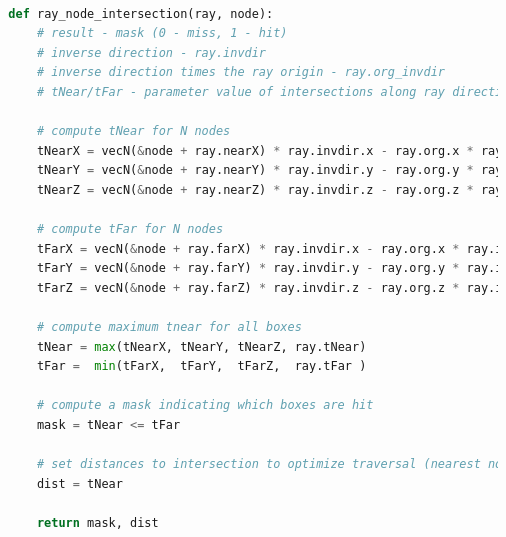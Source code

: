 





\begin{lstlisting}[language=Python,basicstyle=\tiny,caption={A non-branching
      ray-node intersection test for a quad tree implementation with pre-computed
      near and far box coordinate values.},
    label={alg:no-branch ray-box optimized},captionpos=b]

  def ray_node_intersection(ray, node):
      # result - mask (0 - miss, 1 - hit)
      # inverse direction - ray.invdir
      # inverse direction times the ray origin - ray.org_invdir
      # tNear/tFar - parameter value of intersections along ray direction

      # compute tNear for N nodes
      tNearX = vecN(&node + ray.nearX) * ray.invdir.x - ray.org.x * ray.invdir.x
      tNearY = vecN(&node + ray.nearY) * ray.invdir.y - ray.org.y * ray.invdir.y
      tNearZ = vecN(&node + ray.nearZ) * ray.invdir.z - ray.org.z * ray.invdir.z

      # compute tFar for N nodes
      tFarX = vecN(&node + ray.farX) * ray.invdir.x - ray.org.x * ray.invdir.x
      tFarY = vecN(&node + ray.farY) * ray.invdir.y - ray.org.y * ray.invdir.y
      tFarZ = vecN(&node + ray.farZ) * ray.invdir.z - ray.org.z * ray.invdir.z

      # compute maximum tnear for all boxes
      tNear = max(tNearX, tNearY, tNearZ, ray.tNear)
      tFar =  min(tFarX,  tFarY,  tFarZ,  ray.tFar )

      # compute a mask indicating which boxes are hit
      mask = tNear <= tFar

      # set distances to intersection to optimize traversal (nearest nodes first)
      dist = tNear

      return mask, dist
\end{lstlisting}


